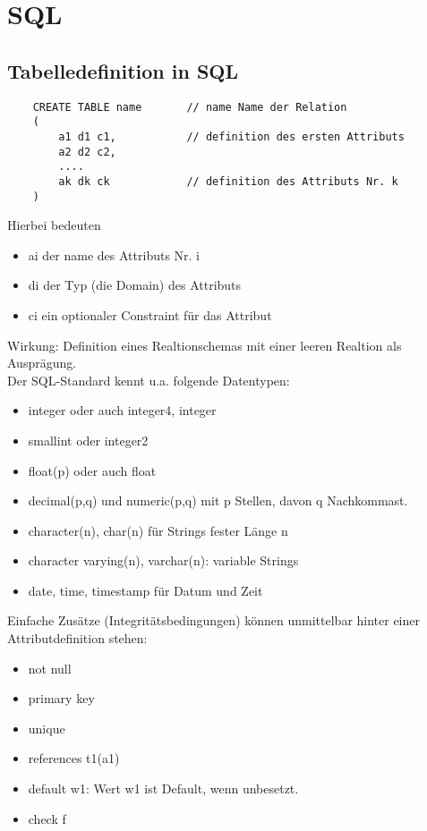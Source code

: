 \section{SQL}
\subsection{Tabelledefinition in SQL}
\begin{verbatim}
    CREATE TABLE name       // name Name der Relation
    (
        a1 d1 c1,           // definition des ersten Attributs
        a2 d2 c2,
        ....
        ak dk ck            // definition des Attributs Nr. k
    )
\end{verbatim}
Hierbei bedeuten
\begin{itemize}
    \item ai der name des Attributs Nr. i
    \item di der Typ (die Domain) des Attributs
    \item ci ein optionaler Constraint f\"ur das Attribut
\end{itemize}
Wirkung: Definition eines Realtionschemas mit einer leeren Realtion als Auspr\"agung.
\\
Der SQL-Standard kennt u.a. folgende Datentypen:
\begin{itemize}
    \item integer oder auch integer4, integer
    \item smallint oder integer2
    \item float(p) oder auch float
    \item decimal(p,q) und numeric(p,q) mit p Stellen, davon q Nachkommast.
    \item character(n), char(n) f\"ur Strings fester L\"ange n
    \item character varying(n), varchar(n): variable Strings
    \item date, time, timestamp f\"ur Datum und Zeit
\end{itemize}
Einfache Zus\"atze (Integrit\"atsbedingungen) k\"onnen unmittelbar hinter einer Attributdefinition stehen:
\begin{itemize}
    \item not null
    \item primary key
    \item unique
    \item references t1(a1)
    \item default w1: Wert w1 ist Default, wenn unbesetzt.
    \item check f
\end{itemize}
